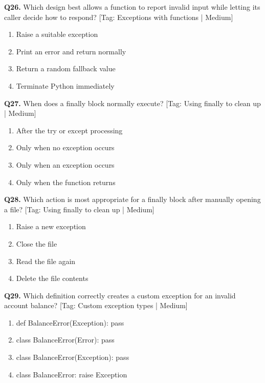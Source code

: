 \vspace{2mm}
\noindent\textbf{Q26.} Which design best allows a function to report invalid input while letting its caller decide how to respond? \hfill [Tag: Exceptions with functions | Medium]
\begin{enumerate}[label=(\alph*),topsep=2pt,itemsep=1pt,partopsep=0pt,parsep=0pt]
    \item {Raise a suitable exception}
    \item {Print an error and return normally}
    \item {Return a random fallback value}
    \item {Terminate Python immediately}
\end{enumerate}
\vspace{2mm}
\noindent\textbf{Q27.} When does a finally block normally execute? \hfill [Tag: Using finally to clean up | Medium]
\begin{enumerate}[label=(\alph*),topsep=2pt,itemsep=1pt,partopsep=0pt,parsep=0pt]
    \item {After the try or except processing}
    \item {Only when no exception occurs}
    \item {Only when an exception occurs}
    \item {Only when the function returns}
\end{enumerate}
\vspace{2mm}
\noindent\textbf{Q28.} Which action is most appropriate for a finally block after manually opening a file? \hfill [Tag: Using finally to clean up | Medium]
\begin{enumerate}[label=(\alph*),topsep=2pt,itemsep=1pt,partopsep=0pt,parsep=0pt]
    \item {Raise a new exception}
    \item {Close the file}
    \item {Read the file again}
    \item {Delete the file contents}
\end{enumerate}
\vspace{2mm}
\noindent\textbf{Q29.} Which definition correctly creates a custom exception for an invalid account balance? \hfill [Tag: Custom exception types | Medium]
\begin{enumerate}[label=(\alph*),topsep=2pt,itemsep=1pt,partopsep=0pt,parsep=0pt]
    \item {def BalanceError(Exception): pass}
    \item {class BalanceError(Error): pass}
    \item {class BalanceError(Exception): pass}
    \item {class BalanceError: raise Exception}
\end{enumerate}
